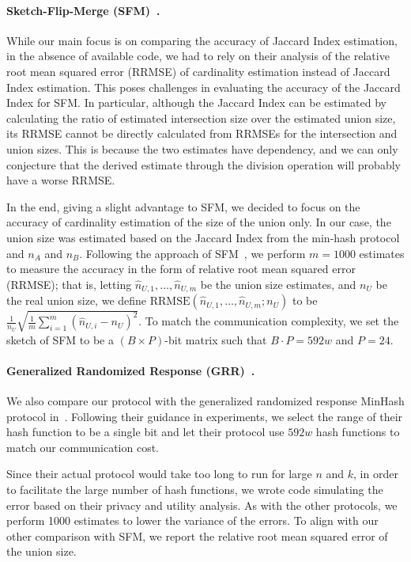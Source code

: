 \paragraph{Sketch-Flip-Merge (SFM)~\cite{ICML:HehTinCor23}.}
%
While our main focus is on comparing the accuracy of Jaccard Index estimation,
in the absence of available code, we had to rely on their analysis of the
relative root mean squared error (RRMSE) of cardinality estimation instead of
Jaccard Index estimation. 
%
This poses challenges in evaluating the accuracy of the Jaccard Index for SFM.
In particular, although the Jaccard Index can be estimated by calculating the
ratio of estimated intersection size over the estimated union size, its RRMSE
cannot be directly calculated from RRMSEs for the intersection and union sizes.
This is because the two estimates have dependency, and we can only conjecture
that the derived estimate through the division operation will probably have a
worse RRMSE. 

In the end, giving a slight advantage to SFM, we decided to focus on the
accuracy of cardinality estimation of the size of the union only. In our case,
the union size was estimated based on the Jaccard Index from the min-hash
protocol and $n_A$ and $n_B$.
%
Following the approach of SFM~\cite{ICML:HehTinCor23}, we perform $m = 1000$
estimates to measure the accuracy in the form of relative root mean squared
error (RRMSE); that is, letting $\hat{n}_{U,1},\dots,\hat{n}_{U,m}$ be the union
size estimates, and $n_U$ be the real union size, we define
    $\text{RRMSE}(\hat{n}_{U,1},\dots,\hat{n}_{U,m}; n_U)$ to be
    $\frac{1}{n_U}\sqrt{\frac{1}{m}\sum_{i=1}^m(\hat{n}_{U,i}- n_{U})^2}$. %
To match the communication complexity, we set the sketch of SFM to be a $(B
\times P)$-bit matrix such that $B \cdot P = 592w$ and $P = 24$. 

\paragraph{Generalized Randomized Response (GRR)~\cite{sisap:AumBouSch20}.}
We also compare our protocol with the generalized randomized response MinHash
protocol in~\cite{sisap:AumBouSch20}. Following their guidance in experiments,
we select the range of their hash function to be a single bit and let their
protocol use $592w$ hash functions to match our communication
cost.

Since their actual
protocol would take too long to run for large $n$ and $k$,
in order to facilitate the large number of hash functions, we wrote code simulating 
the error based on their privacy and utility analysis. As with the other protocols, we perform 1000
estimates to lower the variance of the errors. To align with our other
comparison with SFM, we report the relative root mean squared error of the union
size. 

